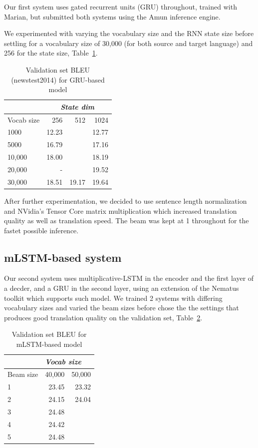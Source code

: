 \documentclass[11pt,a4paper]{article}
\begin{document}
Our first system uses gated recurrent units (GRU) throughout, trained with Marian, but submitted both systems using the Amun inference engine.

We experimented with varying the vocabulary size and the RNN state size before settling for a vocabulary size of 30,000 (for both source and target language) and 256 for the state size, Table~\ref{tab:BLEU for newstest2014}.

\begin{table}
\begin{center}
\begin{tabular}{|l|r|r|r|} \hline
		& \multicolumn{3}{|c|}{\emph{State dim}}	\\ \hline	
Vocab size	& 256	& 512	& 1024 \\ \hline
1000 		& 12.23 &	& 12.77 \\ 
5000		& 16.79	&  	& 17.16 \\ 
10,000		& 18.00	& 	& 18.19 \\
20,000		& -	&	& 19.52 \\ 
30,000		& 18.51	& 19.17	& 19.64 \\ \hline
\end{tabular}
\end{center}
\caption{Validation set BLEU (newstest2014) for GRU-based model}
\label{tab:BLEU for newstest2014}
\end{table}

After further experimentation, we decided to use sentence length normalization and NVidia's Tensor Core matrix multiplication which increased translation quality as well as translation speed. The beam was kept at 1 throughout for the fastet possible inference.

\subsection{mLSTM-based system}

Our second system uses multiplicative-LSTM in the encoder and the first layer of a decder, and a GRU in the second layer, using an extension of the Nematus toolkit which supports such model. We trained 2 systems with differing vocabulary sizes and varied the beam sizes before chose the the settings that produces good translation quality on the validation set, Table~\ref{tab:mLSTM BLEU - vocab sizes}. 

\begin{table}
\begin{center}
\begin{tabular}{|l|r|r|} \hline
		& \multicolumn{2}{|l|}{\emph{Vocab size}}	\\ \hline	
Beam size	& 40,000	& 50,000 \\ \hline
1 		& 23.45		& 23.32	\\ 
2		& 24.15		& 24.04	\\
3		& 24.48		&  	\\
4		& 24.42		& 	\\
5		& 24.48		& 	\\ \hline
\end{tabular}
\end{center}
\caption{Validation set BLEU for mLSTM-based model}
\label{tab:mLSTM BLEU - vocab sizes}
\end{table}
\end{document}
